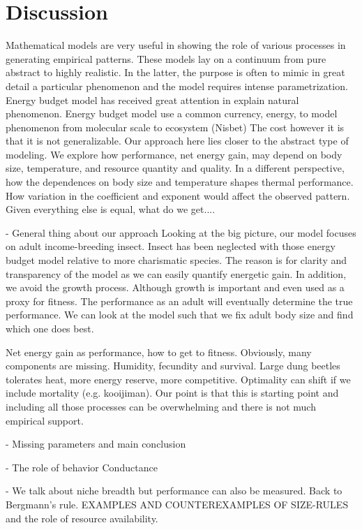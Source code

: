 \section*{Discussion}
Mathematical models are very useful in showing the role of various processes in generating empirical patterns.
These models lay on a continuum from pure abstract to highly realistic.
In the latter, the purpose is often to mimic in great detail a particular phenomenon and the model requires intense parametrization.
Energy budget model has received great attention in explain natural phenomenon.
Energy budget model use a common currency, energy, to model phenomenon from molecular scale to ecosystem (Nisbet)
The cost however it is that it is not generalizable.
Our approach here lies closer to the abstract type of modeling.
We explore how performance, net energy gain, may depend on body size, temperature, and resource quantity and quality. 
In a different perspective, how the dependences on body size and temperature shapes thermal performance.
How variation in the coefficient and exponent would affect the observed pattern.
Given everything else is equal, what do we get....

- General thing about our approach
Looking at the big picture, our model focuses on adult income-breeding insect.
Insect has been neglected with those energy budget model relative to more charismatic species.
The reason is for clarity and transparency of the model as we can easily quantify energetic gain.
In addition, we avoid the growth process.
Although growth is important and even used as a proxy for fitness.
The performance as an adult will eventually determine the true performance.
We can look at the model such that we fix adult body size and find which one does best. 

Net energy gain as performance, how to get to fitness.
Obviously, many components are missing.
Humidity, fecundity and survival.
Large dung beetles tolerates heat, more energy reserve, more competitive.
Optimality can shift if we include mortality (e.g. kooijiman).
Our point is that this is starting point and including all those processes can be overwhelming and there is not much empirical support.


- Missing parameters and main conclusion

 - The role of behavior
 Conductance
 
 - We talk about niche breadth but performance can also be measured.
 Back to Bergmann's rule.
  EXAMPLES AND COUNTEREXAMPLES OF SIZE-RULES 
 and the role of resource availability.
 
